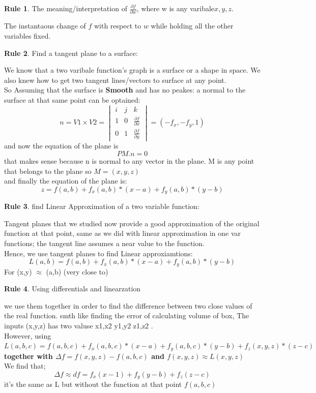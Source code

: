 \documentclass[11pt]{article}
\theoremstyle{definition}
\newtheorem{reg}{Rule}
\begin{document}
\begin{reg}
	The meaning/interpretation of $\frac{\partial f}{\partial w}$, where w is any varibale{$x,y,z$}.
\end{reg}
The instantaous change of $f$ with respect to $w$ while holding all the other variables fixed.
\begin{reg}
Find a tangent plane to a surface:
\end{reg}
We know that a two varibale function's graph is a surface or a shape in space. We also knew how to get two tangent lines/vectors to surface at any point.\\
So Assuming that the surface is \textbf{Smooth} and has no peakes: a normal to the surface at that same point can be optained:
\begin{equation}
	n = V1 \times V2 = \begin{vmatrix}
		i & j & k \\
		1 & 0 & \frac{\partial f}{\partial x}\\
		0 & 1 & \frac{\partial f}{\partial y}
	\end{vmatrix} = (-f_x, -f_y, 1)
\end{equation}
and now the equation of the plane is 
\begin{equation}
	PM . n = 0
\end{equation}
that makes sense because n is normal to any vector in the plane. M is any point that belongs to the plane so $M=(x,y,z)$\\
and finally the equation of the plane is:
\begin{equation}
	z = f(a,b) + f_x(a,b)*(x-a) + f_y(a,b)*(y-b)
\end{equation}
\begin{reg}
	find Linear Approximation of a two variable function:
\end{reg}
Tangent planes that we studied now provide a good approximation of the original function at that point, same as we did with linear approximation in one var functions; the tangent line assumes a near value to the function.\\
Hence, we use tangent planes to find Linear approxiamtions:
\begin{equation}
	L(a,b) = f(a,b) + f_x(a,b)*(x-a) + f_y(a,b)*(y-b)
\end{equation}
For (x,y) $\approx$ (a,b) (very close to)
\begin{reg}
Using differentials and linearzation
\end{reg}
we use them together in order to find the difference between two close values of the real function. smth like finding the error of calculating volume of box, The inputs (x,y,z) has two valuse x1,x2 y1,y2 z1,z2 .\\
However, using \textbf{$L(a,b,c) = f(a,b,c) + f_x(a,b,c)*(x-a) + f_y(a,b,c)*(y-b) + f_z(x,y,z)*(z-c)$ together with $\Delta f = f(x,y,z) - f(a,b,c)$ 
and $f(x,y,z) \approx L(x,y,z)$\\}
We find that;
\begin{equation}
	\Delta f \approx df = f_x(x-1) + f_y(y-b) + f_z(z-c)
\end{equation}
it's the same as L but without the function at that point $f(a,b,c)$
\end{document}
